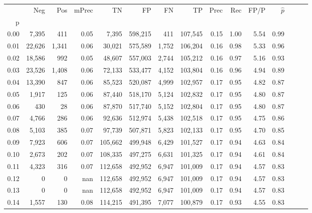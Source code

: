 \begin{tabular}{rrrrrrrrrrrrrrr}
\toprule
{} &     Neg &    Pos & mPrec &       TN &       FP &       FN &       TP &  Prec &   Rec &  FP/P & $\hat{p}$ \\
p    &         &        &       &          &          &          &          &       &       &       &           \\
\midrule
0.00 &   7,395 &    411 &  0.05 &    7,395 &  598,215 &      411 &  107,545 &  0.15 &  1.00 &  5.54 &      0.99 \\
0.01 &  22,626 &  1,341 &  0.06 &   30,021 &  575,589 &    1,752 &  106,204 &  0.16 &  0.98 &  5.33 &      0.96 \\
0.02 &  18,586 &    992 &  0.05 &   48,607 &  557,003 &    2,744 &  105,212 &  0.16 &  0.97 &  5.16 &      0.93 \\
0.03 &  23,526 &  1,408 &  0.06 &   72,133 &  533,477 &    4,152 &  103,804 &  0.16 &  0.96 &  4.94 &      0.89 \\
0.04 &  13,390 &    847 &  0.06 &   85,523 &  520,087 &    4,999 &  102,957 &  0.17 &  0.95 &  4.82 &      0.87 \\
0.05 &   1,917 &    125 &  0.06 &   87,440 &  518,170 &    5,124 &  102,832 &  0.17 &  0.95 &  4.80 &      0.87 \\
0.06 &     430 &     28 &  0.06 &   87,870 &  517,740 &    5,152 &  102,804 &  0.17 &  0.95 &  4.80 &      0.87 \\
0.07 &   4,766 &    286 &  0.06 &   92,636 &  512,974 &    5,438 &  102,518 &  0.17 &  0.95 &  4.75 &      0.86 \\
0.08 &   5,103 &    385 &  0.07 &   97,739 &  507,871 &    5,823 &  102,133 &  0.17 &  0.95 &  4.70 &      0.85 \\
0.09 &   7,923 &    606 &  0.07 &  105,662 &  499,948 &    6,429 &  101,527 &  0.17 &  0.94 &  4.63 &      0.84 \\
0.10 &   2,673 &    202 &  0.07 &  108,335 &  497,275 &    6,631 &  101,325 &  0.17 &  0.94 &  4.61 &      0.84 \\
0.11 &   4,323 &    316 &  0.07 &  112,658 &  492,952 &    6,947 &  101,009 &  0.17 &  0.94 &  4.57 &      0.83 \\
0.12 &       0 &      0 &   nan &  112,658 &  492,952 &    6,947 &  101,009 &  0.17 &  0.94 &  4.57 &      0.83 \\
0.13 &       0 &      0 &   nan &  112,658 &  492,952 &    6,947 &  101,009 &  0.17 &  0.94 &  4.57 &      0.83 \\
0.14 &   1,557 &    130 &  0.08 &  114,215 &  491,395 &    7,077 &  100,879 &  0.17 &  0.93 &  4.55 &      0.83 \\

\end{tabular}
